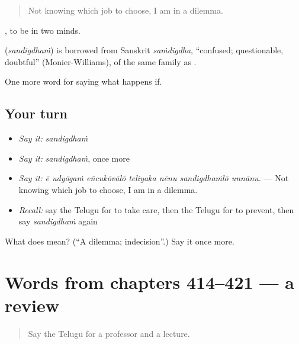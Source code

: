 \begin{quote}
Not knowing which job to choose, I am in a dilemma.
\end{quote}

 , to be in two minds.

\begin{cousinweb}
\textbf{} (\emph{sandigdhaṁ}) is borrowed from Sanskrit \emph{saṁdigdha}, \textquotedblleft{}confused; questionable, doubtful\textquotedblright{} (Monier-Williams), of the same family as .
\end{cousinweb}

\begin{grammarlens}[title={What you've built}]
One more word for saying what happens if.
\end{grammarlens}

\subsection*{Your turn}
\begin{itemize}
\raggedright
  \item \emph{Say it:} \emph{sandigdhaṁ}
  \item \emph{Say it:} \emph{sandigdhaṁ}, once more
  \item \emph{Say it:} \emph{ē udyōgaṁ eñcukōvālō teliyaka nēnu sandigdhaṁlō unnānu.} — Not knowing which job to choose, I am in a dilemma.
  \item \emph{Recall:} say the Telugu for to take care, then the Telugu for to prevent, then say \emph{sandigdhaṁ} again
\end{itemize}

\begin{tcolorbox}[breakable,colback=teal!4,colframe=teal!35!black,title={Before you move on}]
What does  mean? (\textquotedblleft{}A dilemma; indecision\textquotedblright{}.) Say it once more.
\end{tcolorbox}
\section[(dialogue)]{Words from chapters 414–421 — a review}

\label{lesson:TE-R421-review-414-421}



\begin{quote}
Say the Telugu for a professor and a lecture.
\end{quote}

